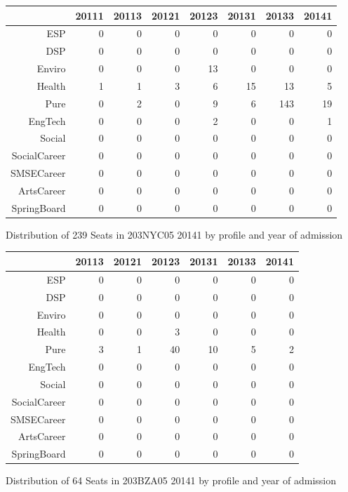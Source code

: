 \documentclass{article}\usepackage[]{graphicx}\usepackage[]{color}
\begin{document}
\begin{figure}[H]
\centering
\begin{tabular}{rrrrrrrr}
  \hline
 & 20111 & 20113 & 20121 & 20123 & 20131 & 20133 & 20141 \\ 
  \hline
ESP &   0 &   0 &   0 &   0 &   0 &   0 &   0 \\ 
  DSP &   0 &   0 &   0 &   0 &   0 &   0 &   0 \\ 
  Enviro &   0 &   0 &   0 &  13 &   0 &   0 &   0 \\ 
  Health &   1 &   1 &   3 &   6 &  15 &  13 &   5 \\ 
  Pure &   0 &   2 &   0 &   9 &   6 & 143 &  19 \\ 
  EngTech &   0 &   0 &   0 &   2 &   0 &   0 &   1 \\ 
  Social &   0 &   0 &   0 &   0 &   0 &   0 &   0 \\ 
  SocialCareer &   0 &   0 &   0 &   0 &   0 &   0 &   0 \\ 
  SMSECareer &   0 &   0 &   0 &   0 &   0 &   0 &   0 \\ 
  ArtsCareer &   0 &   0 &   0 &   0 &   0 &   0 &   0 \\ 
  SpringBoard &   0 &   0 &   0 &   0 &   0 &   0 &   0 \\ 
   \hline
\end{tabular}
\caption{Distribution of 239 Seats in 203NYC05 20141 by profile and year of admission} 
\end{figure}
\begin{figure}[H]
\centering
\begin{tabular}{rrrrrrr}
  \hline
 & 20113 & 20121 & 20123 & 20131 & 20133 & 20141 \\ 
  \hline
ESP &   0 &   0 &   0 &   0 &   0 &   0 \\ 
  DSP &   0 &   0 &   0 &   0 &   0 &   0 \\ 
  Enviro &   0 &   0 &   0 &   0 &   0 &   0 \\ 
  Health &   0 &   0 &   3 &   0 &   0 &   0 \\ 
  Pure &   3 &   1 &  40 &  10 &   5 &   2 \\ 
  EngTech &   0 &   0 &   0 &   0 &   0 &   0 \\ 
  Social &   0 &   0 &   0 &   0 &   0 &   0 \\ 
  SocialCareer &   0 &   0 &   0 &   0 &   0 &   0 \\ 
  SMSECareer &   0 &   0 &   0 &   0 &   0 &   0 \\ 
  ArtsCareer &   0 &   0 &   0 &   0 &   0 &   0 \\ 
  SpringBoard &   0 &   0 &   0 &   0 &   0 &   0 \\ 
   \hline
\end{tabular}
\caption{Distribution of 64 Seats in 203BZA05 20141 by profile and year of admission} 
\end{figure}
\end{document}
